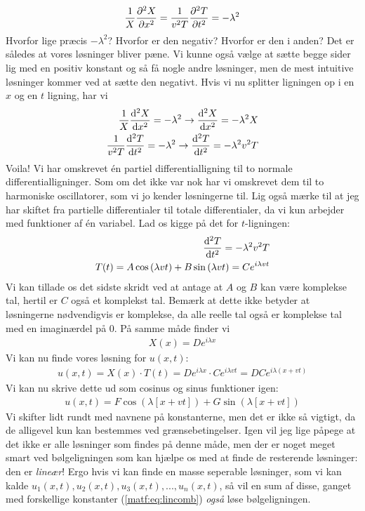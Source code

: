 \documentclass[crop=false, class=memoir]{standalone}
\begin{document}
\begin{align}
    \frac{1}{X} \pdv[2]{X}{x} = \frac{1}{v^2 T}\pdv[2]{T}{t} = -\lambda^2
\end{align}
Hvorfor lige præcis $-\lambda^2$? Hvorfor er den negativ? Hvorfor er den i anden? Det er således at vores løsninger bliver pæne. Vi kunne også vælge at sætte begge sider lig med en positiv konstant og så få nogle andre løsninger, men de mest intuitive løsninger kommer ved at sætte den negativt. Hvis vi nu splitter ligningen op i en $x$ og en $t$ ligning, har vi
\begin{align}
    \frac{1}{X} \dv[2]{X}{x} = - \lambda^2 \rightarrow \dv[2]{X}{x} = -\lambda^2 X\\
    \frac{1}{v^2 T}\dv[2]{T}{t} = -\lambda^2 \rightarrow \dv[2]{T}{t} = -\lambda^2 v^2 T
\end{align}
Voila! Vi har omskrevet én partiel differentialligning til to normale differentialligninger. Som om det ikke var nok har vi omskrevet dem til to harmoniske oscillatorer, som vi jo kender løsningerne til. Lig også mærke til at jeg har skiftet fra partielle differentialer til totale differentialer, da vi kun arbejder med funktioner af én variabel. Lad os kigge på det for $t$-ligningen:
\begin{align}
    \dv[2]{T}{t} = -\lambda^2 v^2 T \\
    T(t) = A\cos{ \left( \lambda v t \right)} + B \sin{\left( \lambda v t \right)} = Ce^{i\lambda vt}
\end{align}
Vi kan tillade os det sidste skridt ved at antage at $A$ og $B$ kan være komplekse tal, hertil er $C$ også et komplekst tal. Bemærk at dette ikke betyder at løsningerne nødvendigvis er komplekse, da alle reelle tal også er komplekse tal med en imaginærdel på $0$. På samme måde finder vi 
\begin{align}
    X(x) = De^{i\lambda x}
\end{align}
Vi kan nu finde vores løsning for $u(x,t)$:
\begin{align}
    u(x,t) = X(x)\cdot T(t) = De^{i\lambda x} \cdot Ce^{i\lambda vt} = DC e^{i\lambda\left( x + vt \right)}
\end{align}
Vi kan nu skrive dette ud som cosinus og sinus funktioner igen:
\begin{align}
    u(x,t) = F\cos{\left(\lambda \left[x + vt\right] \right)} + G\sin{\left(\lambda \left[x + vt\right] \right)}
\end{align}
Vi skifter lidt rundt med navnene på konstanterne, men det er ikke så vigtigt, da de alligevel kun kan bestemmes ved grænsebetingelser. Igen vil jeg lige påpege at det ikke er alle løsninger som findes på denne måde, men der er noget meget smart ved bølgeligningen som kan hjælpe os med at finde de resterende løsninger: den er \emph{lineær}! Ergo hvis vi kan finde en masse seperable løsninger, som vi kan kalde $u_1(x,t), u_2(x,t), u_3(x,t), ..., u_n(x,t)$, så vil en sum af disse, ganget med forskellige konstanter (\cref{matf:eq:lincomb}) \emph{også} løse bølgeligningen.
\end{document}
